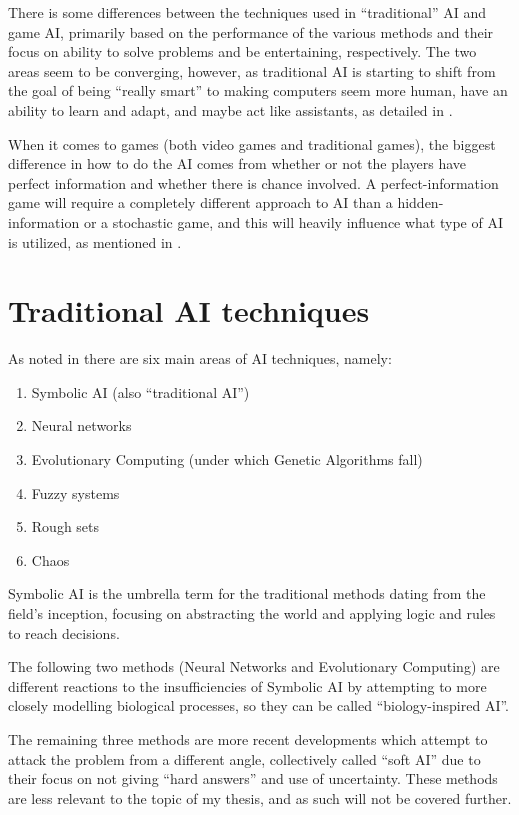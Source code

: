 \documentclass[]{report}
\begin{document}
There is some differences between the techniques used in ``traditional'' AI and
game AI, primarily based on the performance of the various methods and their
focus on ability to solve problems and be entertaining, respectively. The two
areas seem to be converging, however, as traditional AI is starting to shift
from the goal of being ``really smart'' to making computers seem more human,
have an ability to learn and adapt, and maybe act like assistants, as detailed
in \citet[][]{ramos2008guest}.

When it comes to games (both video games and traditional games), the biggest
difference in how to do the AI comes from whether or not the players have
perfect information and whether there is chance involved. A perfect-information
game will require a completely different approach to AI than a
hidden-information or a stochastic game, and this will heavily influence what
type of AI is utilized, as mentioned in \citet[pg.~4-5]{schaeffer2002games}.

\section{Traditional AI techniques}
\label{sec:trad-ai-techn}

As noted in \citet[chap.~1]{munakata2008fundamentals} there are six main areas
of AI techniques, namely:

\begin{enumerate}
\item Symbolic AI (also ``traditional AI'')
\item Neural networks
\item Evolutionary Computing (under which Genetic Algorithms fall)
\item Fuzzy systems
\item Rough sets
\item Chaos
\end{enumerate}

Symbolic AI is the umbrella term for the traditional methods dating from the
field's inception, focusing on abstracting the world and applying logic and
rules to reach decisions.

The following two methods (Neural Networks and Evolutionary Computing) are
different reactions to the insufficiencies of Symbolic AI by attempting to more
closely modelling biological processes, so they can be called ``biology-inspired
AI''.

The remaining three methods are more recent developments which attempt to attack
the problem from a different angle, collectively called ``soft AI'' due to their
focus on not giving ``hard answers'' and use of uncertainty. These methods are
less relevant to the topic of my thesis, and as such will not be covered
further.
\end{document}

